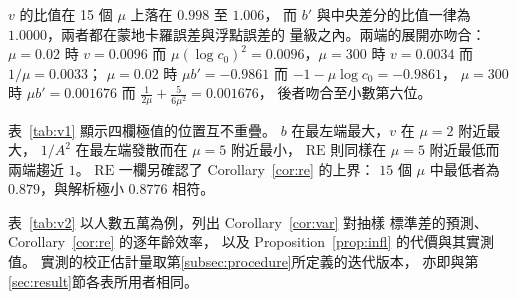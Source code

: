 \documentclass[UTF8, fontset=macnew, a4paper, 12pt]{ctexart}
\begin{document}
$v$ 的比值在 15 個 $\mu$ 上落在 $0.998$ 至 $1.006$，
而 $b'$ 與中央差分的比值一律為 $1.0000$，兩者都在蒙地卡羅誤差與浮點誤差的
量級之內。兩端的展開亦吻合：$\mu=0.02$ 時 $v=0.0096$ 而
$\mu(\log c_0)^2=0.0096$，$\mu=300$ 時 $v=0.0034$ 而 $1/\mu=0.0033$；
$\mu=0.02$ 時 $\mu b'=-0.9861$ 而 $-1-\mu\log c_0=-0.9861$，
$\mu=300$ 時 $\mu b'=0.001676$ 而 $\frac{1}{2\mu}+\frac{5}{6\mu^2}=0.001676$，
後者吻合至小數第六位。

表~\ref{tab:v1} 顯示四欄極值的位置互不重疊。
$b$ 在最左端最大，$v$ 在 $\mu=2$ 附近最大，
$1/A^2$ 在最左端發散而在 $\mu=5$ 附近最小，
$\mathrm{RE}$ 則同樣在 $\mu=5$ 附近最低而兩端趨近 $1$。
$\mathrm{RE}$ 一欄另確認了 Corollary~\ref{cor:re} 的上界：
$15$ 個 $\mu$ 中最低者為 $0.879$，與解析極小 $0.8776$ 相符。


表~\ref{tab:v2} 以人數五萬為例，列出 Corollary~\ref{cor:var} 對抽樣
標準差的預測、Corollary~\ref{cor:re} 的逐年齡效率，
以及 Proposition~\ref{prop:infl} 的代價與其實測值。
實測的校正估計量取第\ref{subsec:procedure}所定義的迭代版本，
亦即與第\ref{sec:result}節各表所用者相同。
\end{document}
